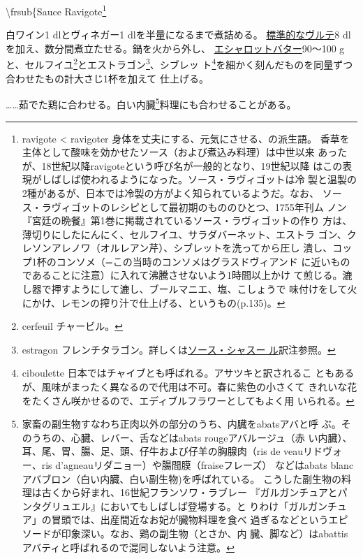 \begin{recette}
\textbackslash{}frsub\{Sauce Ravigote\footnote{ravigote \textless{}
  ravigoter 身体を丈夫にする、元気にさせる、の派生語。
  香草を主体として酸味を効かせたソース（および煮込み料理）は中世以来
  あったが、18世紀以降ravigoteという呼び名が一般的となり、19世紀以降
  はこの表現がしばしば使われるようになった。ソース・ラヴィゴットは冷
  製と温製の2種があるが、日本では冷製の方がよく知られているようだ。なお、
  ソース・ラヴィゴットのレシピとして最初期のもののひとつ、1755年刊ム
  ノン『宮廷の晩餐』第1巻に掲載されているソース・ラヴィゴットの作り
  方は、薄切りにしたにんにく、セルフイユ、サラダバーネット、エストラ
  ゴン、クレソンアレノワ（オルレアン芹）、シブレットを洗ってから圧し
  潰し、コップ1杯のコンソメ（=この当時のコンソメはグラスドヴィアンド
  に近いものであることに注意）に入れて沸騰させないよう1時間以上かけ
  て煎じる。漉し器で押すようにして漉し、ブールマニエ、塩、こしょうで
  味付けをして火にかけ、レモンの搾り汁で仕上げる、というもの(p.135)。}


白ワイン1\undemi{} dlとヴィネガー1\undemi{} dlを半量になるまで煮詰める。
\protect\hyperlink{veloute}{標準的なヴルテ}8
dlを加え、数分間煮立たせる。鍋を火から外し、
\protect\hyperlink{beurre-d-echalote}{エシャロットバター}90〜100
gと、セルフイユ\footnote{cerfeuil チャービル。}とエストラゴン\footnote{estragon
  フレンチタラゴン。詳しくは\protect\hyperlink{sauce-chasseur}{ソース・シャスー
  ル}訳注参照。}、シブレッ ト\footnote{ciboulette
  日本ではチャイブとも呼ばれる。アサツキと訳されるこ
  ともあるが、風味がまったく異なるので代用は不可。春に紫色の小さくて
  きれいな花をたくさん咲かせるので、エディブルフラワーとしてもよく用
  いられる。}を細かく刻んだものを同量ずつ合わせたもの計大さじ1\undemi{}杯を加えて
仕上げる。

\ldots{}\ldots{}茹でた鶏に合わせる。白い内臓\footnote{家畜の副生物すなわち正肉以外の部分のうち、内臓をabatsアバと呼
  ぶ。そのうちの、心臓、レバー、舌などはabats rougeアバルージュ（赤
  い内臓）、耳、尾、胃、腸、足、頭、仔牛および仔羊の胸腺肉（ris de
  veauリドヴォー、ris d'agneauリダニョー）や腸間膜（fraiseフレーズ）
  などはabats blancアバブロン（白い内臓、白い副生物)を呼ばれている。
  こうした副生物の料理は古くから好まれ、16世紀フランソワ・ラブレー
  『ガルガンチュアとパンタグリュエル』においてもしばしば登場する。と
  りわけ「ガルガンチュア」の冒頭では、出産間近なお妃が臓物料理を食べ
  過ぎるなどというエピソードが印象深い。なお、鶏の副生物（とさか、内
  臓、脚など）はabattisアバティと呼ばれるので混同しないよう注意。}料理にも合わせることがある。


\end{recette}
